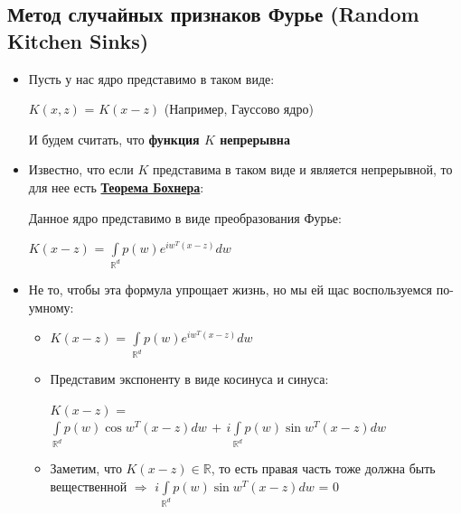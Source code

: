     \subsection{Метод случайных признаков Фурье (Random Kitchen Sinks)}

        \begin{itemize}
            \item Пусть у нас ядро представимо в таком виде:
            \begin{center}
                $K(x, z)$ = $K(x - z)$ \quad\quad(Например, Гауссово ядро)
            \end{center}
                И будем считать, что \textbf{функция $K$ непрерывна}


            \item Известно, что если $K$ представима в таком виде и является непрерывной, то для нее есть \underline{\textbf{Теорема Бохнера}}:
            \begin{theorem}
                Данное ядро представимо в виде преобразования Фурье:
                \begin{center}
                \large
                    $K(x - z)$ = $\int\limits_{\mathbb{R}^d} p(w) e^{iw^T(x - z)} dw$
                \end{center}
            \end{theorem}


            \item Не то, чтобы эта формула упрощает жизнь, но мы ей щас воспользуемся по-умному:
            \begin{itemize}
                \item {}
                
                \begin{center}
                \large
                    $K(x - z)$ = $\int\limits_{\mathbb{R}^d} p(w) e^{iw^T(x - z)} dw$
                \end{center}

                \item {Представим экспоненту в виде косинуса и синуса:}

                    \begin{center}
                    \large
                         $K(x - z)$ = $\int\limits_{\mathbb{R}^d} p(w) \cos w^T(x - z) dw \, + \, i\int\limits_{\mathbb{R}^d} p(w) \sin w^T(x - z) dw$
                    \end{center}

                \item{Заметим, что $K(x - z) \in \mathbb{R}$, то есть правая часть тоже должна быть вещественной $\Longrightarrow$ $i\int\limits_{\mathbb{R}^d} p(w) \sin w^T(x - z) dw$ = $0$}


\end{itemize}
\end{itemize}
